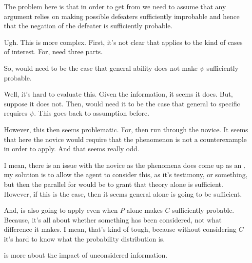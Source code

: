 \begin{note}
  \color{red}
  The problem here is that in order to get \nI{} from \wnf{} we need to assume that any argument relies on making possible defeaters sufficiently improbable and hence that the negation of the defeater is sufficiently probable.

  Ugh.
  This is more complex.
  First, it's not clear that \wnf{} applies to the kind of cases of interest.
  For, need three parts.

  So, would need to be the case that general ability does not make \(\psi\) sufficiently probable.

  Well, it's hard to evaluate this.
  Given the information, it seems it does.
  But, suppose it does not.
  Then, would need it to be the case that general to specific requires \(\psi\).
  This goes back to assumption before.

  However, this then seems problematic.
  For, then run through the novice.
  It seems that here the novice would require that the phenomenon is not a counterexample in order to apply.
  And that seems really odd.

  I mean, there is an issue with the novice as the phenomena does come up as an \expec{}, my solution is to allow the agent to consider this, as it's testimony, or something, but then the parallel for \wnf{} would be to grant that theory alone is sufficient.
  However, if this is the case, then it seems general alone is going to be sufficient.

  And, \nI{} is also going to apply even when \(P\) alone makes \(C\) sufficiently probable.
  Because, it's all about whether something has been considered, not what difference it makes.
  I mean, that's kind of tough, because without considering \(C\) it's hard to know what the probability distribution is.

  \nI{} is more about the impact of unconsidered information.
\end{note}

